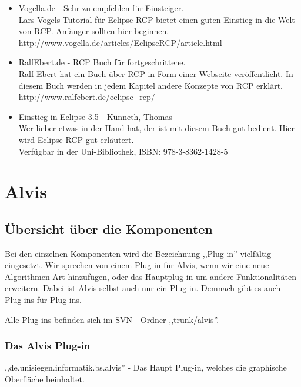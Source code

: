 \documentclass[10pt,a4paper,oneside]{scrbook}
\begin{document}
\begin{itemize}
\item Vogella.de - Sehr zu empfehlen für Einsteiger. \\
Lars Vogels Tutorial für Eclipse RCP bietet einen guten Einstieg in die Welt von RCP. Anfänger sollten hier beginnen.\\
http://www.vogella.de/articles/EclipseRCP/article.html
\item RalfEbert.de - RCP Buch für fortgeschrittene. \\
Ralf Ebert hat ein Buch über RCP in Form einer Webseite veröffentlicht. In diesem Buch werden in jedem Kapitel andere Konzepte von RCP erklärt. \\
http://www.ralfebert.de/eclipse\_rcp/
\item Einstieg in Eclipse 3.5 - Künneth, Thomas \\
Wer lieber etwas in der Hand hat, der ist mit diesem Buch gut bedient. Hier wird Eclipse RCP gut erläutert. \\
Verfügbar in der Uni-Bibliothek, ISBN: 978-3-8362-1428-5
\end{itemize}



\newpage
\chapter{Alvis}
\section{Übersicht über die Komponenten}
Bei den einzelnen Komponenten wird die Bezeichnung ,,Plug-in'' vielfältig eingesetzt. Wir sprechen von einem Plug-in für Alvis, wenn wir eine neue Algorithmen Art hinzufügen, oder das Hauptplug-in um andere Funktionalitäten erweitern. Dabei ist Alvis selbst auch nur ein Plug-in. Demnach gibt es auch Plug-ins für Plug-ins.

Alle Plug-ins befinden sich im SVN - Ordner ,,trunk/alvis''.
\subsection{Das Alvis Plug-in}
,,de.unisiegen.informatik.bs.alvis'' - Das Haupt Plug-in, welches die graphische Oberfläche beinhaltet.
\end{document}
